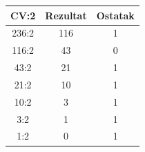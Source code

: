 \begin{tabular}{ccc}\toprule
CV:2&Rezultat&Ostatak\\\midrule
236:2&116&1\\116:2&43&0\\43:2&21&1\\21:2&10&1\\10:2&3&1\\3:2&1&1\\1:2&0&1\\\bottomrule
\end{tabular}
